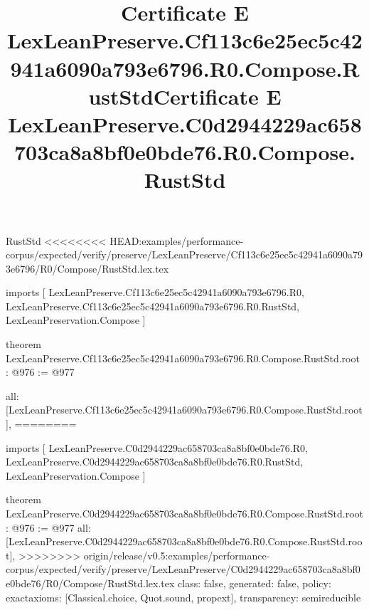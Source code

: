 \begin{lexlean}{RustStd}
<<<<<<<< HEAD:examples/performance-corpus/expected/verify/preserve/LexLeanPreserve/Cf113c6e25ec5c42941a6090a793e6796/R0/Compose/RustStd.lex.tex
\title{Certificate E LexLeanPreserve.Cf113c6e25ec5c42941a6090a793e6796.R0.Compose.RustStd}
\begin{coremodule}
imports [
  LexLeanPreserve.Cf113c6e25ec5c42941a6090a793e6796.R0,
  LexLeanPreserve.Cf113c6e25ec5c42941a6090a793e6796.R0.RustStd,
  LexLeanPreservation.Compose
]

theorem LexLeanPreserve.Cf113c6e25ec5c42941a6090a793e6796.R0.Compose.RustStd.root : @976 := @977 {
  all: [LexLeanPreserve.Cf113c6e25ec5c42941a6090a793e6796.R0.Compose.RustStd.root],
========
\title{Certificate E LexLeanPreserve.C0d2944229ac658703ca8a8bf0e0bde76.R0.Compose.RustStd}
\begin{coremodule}
imports [
  LexLeanPreserve.C0d2944229ac658703ca8a8bf0e0bde76.R0,
  LexLeanPreserve.C0d2944229ac658703ca8a8bf0e0bde76.R0.RustStd,
  LexLeanPreservation.Compose
]

theorem LexLeanPreserve.C0d2944229ac658703ca8a8bf0e0bde76.R0.Compose.RustStd.root : @976 := @977 {
  all: [LexLeanPreserve.C0d2944229ac658703ca8a8bf0e0bde76.R0.Compose.RustStd.root],
>>>>>>>> origin/release/v0.5:examples/performance-corpus/expected/verify/preserve/LexLeanPreserve/C0d2944229ac658703ca8a8bf0e0bde76/R0/Compose/RustStd.lex.tex
  class: false,
  generated: false,
  policy: exact{axioms: [Classical.choice, Quot.sound, propext]},
  transparency: semireducible
}


\end{coremodule}}
\end{coremodule}
\end{lexlean}
